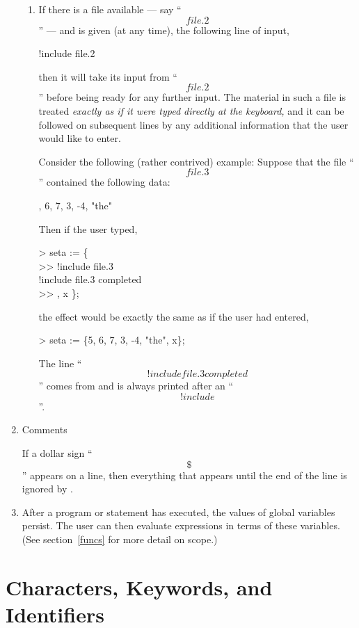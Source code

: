 \begin{enumerate}
\begin{enumerate}
    \item
    If there is a file available --- say ``\[file.2\]'' --- and
    \ISETL{} is given (at any time), the following line of input,

    \DS !include file.2 \DE

    then it will take its input from ``\[file.2\]''
    before being ready for any further input.
    The material in such a file is treated
    {\em exactly as if it were typed directly at the keyboard,\/}
    and it can be followed on subsequent lines
    by any additional information that
    the user would like to enter.

    Consider the following (rather contrived) example:
    Suppose that the file ``\[file.3\]'' contained the following data:

    , 6, 7, 3, -4, "the" \DE

    Then if the user typed,

\DS
>      seta := \{\\
>>     !include file.3\\
!include file.3 completed\\
>>     , x \};\\
\DE

    the effect would be exactly the same as if the user had entered,

\DS
>      seta := \{5, 6, 7, 3, -4, "the", x\};\\
\DE

    The line ``\[!include file.3 completed\]''
    comes from \ISETL{} and is always printed after an ``\[!include\]''.
\end{enumerate}

\item
Comments

If a dollar sign ``\[\$\]'' appears on a line,
then everything that appears until
the end of the line is ignored by \ISETL{}\@.

\item
After a program or statement has executed,
the values of global variables persist.
The user can then evaluate expressions in terms of these variables.
(See section~\ref{funcs} for more detail on scope.)
\end{enumerate}


\section{Characters, Keywords, and Identifiers}\label{char-key}

